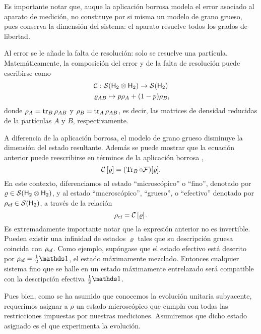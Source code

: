 Es importante notar que, auque la aplicación borrosa modela el error asociado al aparato de medición, no constituye por si misma un modelo de grano grueso, pues conserva la dimensión del sistema: el aparato resuelve todos los grados de libertad.


Al error se le añade la falta de resolución: solo se resuelve una partícula. Matemáticamente, la composición del error y de la falta de resolución puede escribirse como
\begin{gather}
    \mcC:\mcS(\hilbert_2 \otimes \hilbert_2)\to \mcS(\hilbert_2)\nonumber\\
    \varrho_{AB} \mapsto p\rho_A+(1-p)\rho_B\rlap{,}\nonumber
\end{gather}
donde $\rho_A=\tr_B \rho_{AB}$ y $\rho_B=\tr_A \rho_{AB}$, es decir, las matrices de densidad reducidas de la partículas $A$ y $B$, respectivamente.


A diferencia de la aplicación borrosa, el modelo de grano grueso disminuye la dimensión del estado resultante. Además se puede mostrar que la ecuación anterior puede reescribirse en términos de la aplicación borrosa \cite{FuzzyMeasurements},
\begin{equation}
\mathcal{C}\left[\varrho\right]=(\Tr_{B}\circ\mathcal{F})[\varrho].\nonumber
\end{equation}
En este contexto, diferenciamos al estado ``microscópico'' o ``fino'', denotado por $\varrho\in \mathcal{S}({\sf H}_2\otimes{\sf H}_2)$, y al estado ``macroscópico'', ``grueso'', o  ``efectivo'' denotado por $\rho_{\text{ef}}\in \mathcal{S}({\sf H}_2)$, a través de la relación
\begin{equation}
    \rho_{\text{ef}}=\mathcal{C}\left[\varrho\right].\nonumber
\end{equation}
Es extremadamente importante notar que la expresión anterior no es invertible. Pueden existir una infinidad de estados $\varrho$ tales que su descripción gruesa coincida con $\rho_{\text{ef}}$. Como ejemplo, supóngase que el estado efectivo está descrito por $\rho_{\ef}=\frac{1}{2}\Id$, el estado máximamente mezclado. Entonces cualquier sistema fino que se halle en un estado máximamente entrelazado será compatible con la descripción efectiva $\frac{1}{2}\Id$.

Pues bien, como se ha asumido que conocemos la evolución unitaria subyacente, requerimos asignar a $\rho$ un estado microscópico que cumpla con todas las restricciones impuestas por nuestras mediciones. Asumiremos que dicho estado asignado es el que experimenta la evolución. 

